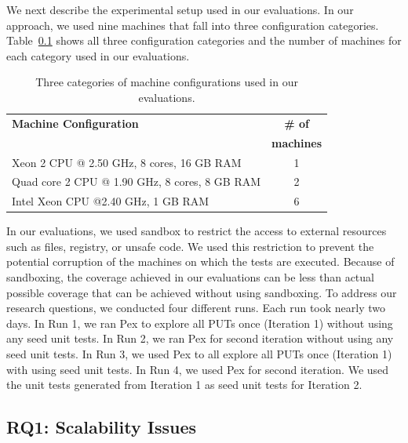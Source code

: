 We next describe the experimental setup used in our evaluations. In our approach, we used nine 
machines that fall into three configuration categories. Table~\ref{} shows all three configuration
categories and the number of machines for each category used in our evaluations.

\setlength{\tabcolsep}{1pt}
\begin{table}[t]
\begin{SmallOut}
\begin{CodeOut}
\begin{center}
\begin {tabular} {|l|c|}
\hline
\textbf{Machine Configuration} & \textbf{\# of } \\  
 & \textbf{machines} \\  
\hline
\hline  Xeon 2 CPU @ 2.50 GHz, 8 cores, 16 GB RAM & 1 \\
\hline  Quad core 2 CPU @ 1.90 GHz, 8 cores, 8 GB RAM & 2 \\
\hline  Intel Xeon CPU @2.40 GHz, 1 GB RAM & 6 \\
\hline
\end{tabular}
\end{center}
\end{CodeOut}
\end{SmallOut}\vspace*{-4ex}
\centering \caption {Three categories of machine configurations used in our evaluations.}
\end{table}

In our evaluations, we used sandbox to restrict the access to external resources such
as files, registry, or unsafe code. We used this restriction to prevent the potential
corruption of the machines on which the tests are executed. Because of sandboxing,
the coverage achieved in our evaluations can be less than actual possible coverage
that can be achieved without using sandboxing. To address our research questions, 
we conducted four different runs. Each run took nearly two days. In Run 1, we ran
Pex to explore all PUTs once (Iteration 1) without using any seed unit tests.
In Run 2, we ran Pex for second iteration without using any seed unit tests. 
In Run 3, we used Pex to all explore all PUTs once (Iteration 1) with using 
seed unit tests. In Run 4, we used Pex for second iteration. We used the unit
tests generated from Iteration 1 as seed unit tests for Iteration 2.

\subsection{RQ1: Scalability Issues}

